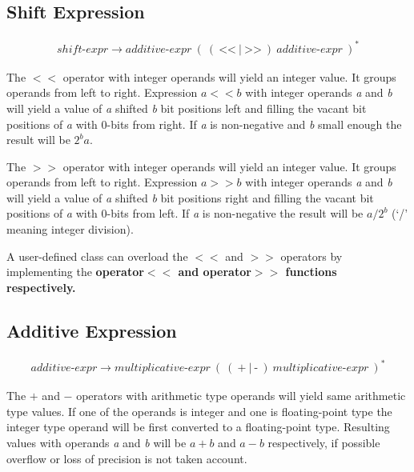 \documentclass[a4paper,oneside,11pt]{article}
\begin{document}
\subsection{Shift Expression}\label{shift}

\begin{align*}
shift\textrm{-}expr \rightarrow \hyperref[additive]{additive\textrm{-}expr} \> ( \> ( \> \texttt{<<} \> | \> \texttt{>>} \> ) \>
\hyperref[additive]{additive\textrm{-}expr} \> )^*
\end{align*}

The $<<$ operator with integer operands will yield an integer value. It groups operands from left to right.
Expression $a << b$ with integer operands \emph{a} and \emph{b} will yield a value of \emph{a} shifted \emph{b} bit positions left and
filling the vacant bit positions of \emph{a} with 0-bits from right.
If \emph{a} is non-negative and \emph{b} small enough the result will be $2^ba$.

The $>>$ operator with integer operands will yield an integer value. It groups operands from left to right.
Expression $a >> b$ with integer operands \emph{a} and \emph{b} will yield a value of \emph{a} shifted \emph{b} bit positions right and
filling the vacant bit positions of \emph{a} with 0-bits from left.
If \emph{a} is non-negative the result will be $a / 2^b$ (`/' meaning integer division).

A user-defined class can overload the $<<$ and $>>$ operators by implementing the \bf{operator$<<$} and \bf{operator$>>$} functions respectively.

\subsection{Additive Expression}\label{additive}

\begin{align*}
additive\textrm{-}expr \rightarrow \hyperref[multiplicative]{multiplicative\textrm{-}expr} \> ( \> ( \> \texttt{+} \> | \> \texttt{-} \> ) \>
\hyperref[multiplicative]{multiplicative\textrm{-}expr} \>)^*
\end{align*}

The $+$ and $-$ operators with arithmetic type operands will yield same arithmetic type values.
If one of the operands is integer and one is floating-point type the integer type operand will be first converted to a floating-point type.
Resulting values with operands \emph{a} and \emph{b} will be $a + b$ and $a - b$ respectively,
if possible overflow or loss of precision is not taken account.
\end{document}
